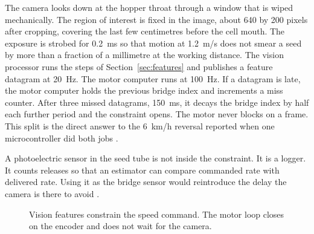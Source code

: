 The camera looks down at the hopper throat through a window that is wiped mechanically. The region of interest is fixed in the image, about 640 by 200 pixels after cropping, covering the last few centimetres before the cell mouth. The exposure is strobed for 0.2~ms so that motion at 1.2~m/s does not smear a seed by more than a fraction of a millimetre at the working distance. The vision processor runs the steps of Section~\ref{sec:features} and publishes a feature datagram at 20~Hz. The motor computer runs at 100~Hz. If a datagram is late, the motor computer holds the previous bridge index and increments a miss counter. After three missed datagrams, 150~ms, it decays the bridge index by half each further period and the constraint opens. The motor never blocks on a frame. This split is the direct answer to the 6~km/h reversal reported when one microcontroller did both jobs \cite{borja2021}.

A photoelectric sensor in the seed tube is not inside the constraint. It is a logger. It counts releases so that an estimator can compare commanded rate with delivered rate. Using it as the bridge sensor would reintroduce the delay the camera is there to avoid \cite{kocher1998,lan1999}.

\begin{figure}[htbp]
\centering
{}
\caption{Vision features constrain the speed command. The motor loop closes on the encoder and does not wait for the camera.}
\label{fig:cascade}
\end{figure}


